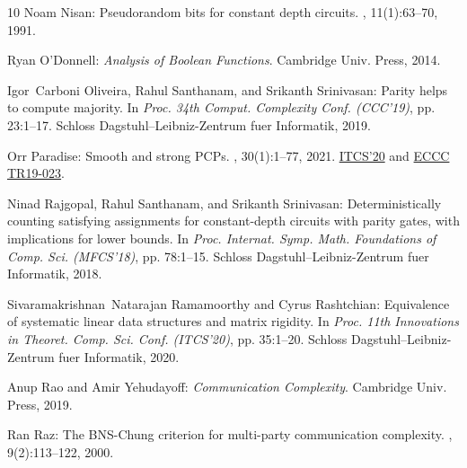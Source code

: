 \documentclass[11pt]{article}
\begin{document}
\begin{thebibliography}{10}
{\sc Noam Nisan}: Pseudorandom bits for constant depth circuits.
, 11(1):63--70, 1991.
\newblock [\epfmtdoi{10.1007/BF01375474}]

{\sc Ryan O'Donnell}: {\em Analysis of {B}oolean Functions}.
\newblock Cambridge Univ. Press, 2014.

{\sc Igor~Carboni Oliveira, Rahul Santhanam, and Srikanth Srinivasan}: Parity
  helps to compute majority.
\newblock In {\em Proc. 34th Comput. Complexity Conf. (CCC'19)}, pp. 23:1--17.
  Schloss Dagstuhl--Leibniz-Zentrum fuer Informatik, 2019.

{\sc Orr Paradise}: Smooth and strong {PCP}s.
, 30(1):1--77, 2021.
\newblock \prelim \href{https://doi.org/10.4230/LIPIcs.ITCS.2020.2}{ITCS'20}
  and \href{https://eccc.weizmann.ac.il/eccc-reports/2019/TR19-023/}{ECCC
  TR19-023}.
\newblock [\epfmtdoi{10.1007/s00037-020-00199-3}]

{\sc Ninad Rajgopal, Rahul Santhanam, and Srikanth Srinivasan}:
  Deterministically counting satisfying assignments for constant-depth circuits
  with parity gates, with implications for lower bounds.
\newblock In {\em Proc. Internat. Symp. Math. Foundations of Comp. Sci.
  (MFCS'18)}, pp. 78:1--15. Schloss Dagstuhl--Leibniz-Zentrum fuer Informatik,
  2018.

{\sc Sivaramakrishnan~Natarajan Ramamoorthy and Cyrus Rashtchian}: Equivalence
  of systematic linear data structures and matrix rigidity.
\newblock In {\em Proc. 11th Innovations in Theoret. Comp. Sci. Conf.
  (ITCS'20)}, pp. 35:1--20. Schloss Dagstuhl--Leibniz-Zentrum fuer Informatik,
  2020.

{\sc Anup Rao and Amir Yehudayoff}: {\em Communication Complexity}.
\newblock Cambridge Univ. Press, 2019.
\newblock [\epfmtdoi{10.1017/9781108671644}]

{\sc Ran Raz}: The {BNS}-{C}hung criterion for multi-party communication
  complexity.
, 9(2):113--122, 2000.
\newblock [\epfmtdoi{10.1007/PL00001602}]


\end{thebibliography}
\end{document}
